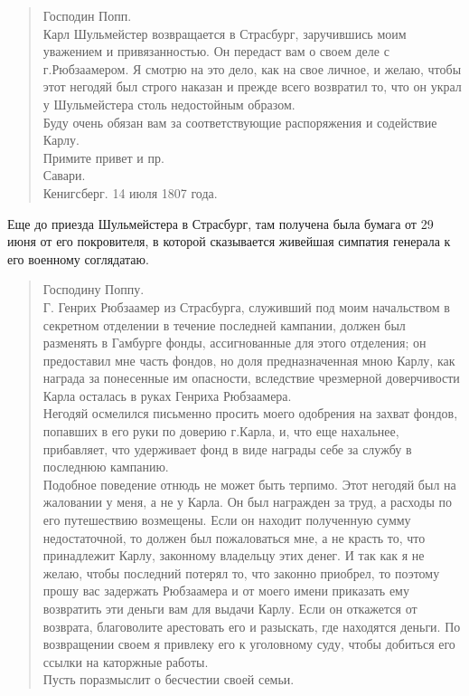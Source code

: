 \documentclass[
  oneside,
  12pt,
  titlepage]{book}
\begin{document}
\begin{quote}
Господин Попп.\\
Карл Шульмейстер возвращается в Страсбург, заручившись моим уважением и привязанностью. Он передаст вам о своем деле с г.Рюбзаамером. Я смотрю на это дело, как на свое личное, и желаю, чтобы этот негодяй был строго наказан и прежде всего возвратил то, что он украл у Шульмейстера столь недостойным образом.\\
Буду очень обязан вам за соответствующие распоряжения и содействие Карлу.\\
Примите привет и пр.\\
Савари.\\
Кенигсберг. 14 июля 1807 года.
\end{quote}

Еще до приезда Шульмейстера в Страсбург, там получена была бумага от 29 июня от его покровителя, в которой сказывается живейшая симпатия генерала к его военному соглядатаю.

\begin{quote}
Господину Поппу.\\
Г. Генрих Рюбзаамер из Страсбурга, служивший под моим начальством в секретном отделении в течение последней кампании, должен был разменять в Гамбурге фонды, ассигнованные для этого отделения; он предоставил мне часть фондов, но доля предназначенная мною Карлу, как награда за понесенные им опасности, вследствие чрезмерной доверчивости Карла осталась в руках Генриха Рюбзаамера.\\
Негодяй осмелился письменно просить моего одобрения на захват фондов, попавших в его руки по доверию г.Карла, и, что еще нахальнее, прибавляет, что удерживает фонд в виде награды себе за службу в последнюю кампанию.\\
Подобное поведение отнюдь не может быть терпимо. Этот негодяй был на жаловании у меня, а не у Карла. Он был награжден за труд, а расходы по его путешествию возмещены. Если он находит полученную сумму недостаточной, то должен был пожаловаться мне, а не красть то, что принадлежит Карлу, законному владельцу этих денег. И так как я не желаю, чтобы последний потерял то, что законно приобрел, то поэтому прошу вас задержать Рюбзаамера и от моего имени приказать ему возвратить эти деньги вам для выдачи Карлу. Если он откажется от возврата, благоволите арестовать его и разыскать, где находятся деньги. По возвращении своем я привлеку его к уголовному суду, чтобы добиться его ссылки на каторжные работы.\\
Пусть поразмыслит о бесчестии своей семьи.
\end{quote}
\end{document}
